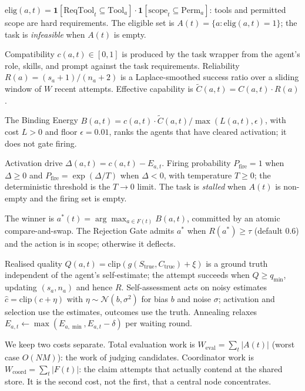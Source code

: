 \documentclass[11pt]{article}
\begin{document}
\begin{description}\itemsep2pt
\item[Eligibility (binary).] $\mathrm{elig}(a,t)=\mathbf{1}[\mathrm{ReqTool}_t\subseteq \mathrm{Tool}_a]\cdot\mathbf{1}[\mathrm{scope}_t\subseteq \mathrm{Perm}_a]$: tools and permitted scope are hard requirements. The eligible set is $A(t)=\{a: \mathrm{elig}(a,t)=1\}$; the task is \emph{infeasible} when $A(t)$ is empty.
\item[Compatibility and reliability.] Compatibility $c(a,t)\in[0,1]$ is produced by the task wrapper from the agent's role, skills, and prompt against the task requirements. Reliability $R(a)=(s_a+1)/(n_a+2)$ is a Laplace-smoothed success ratio over a sliding window of $W$ recent attempts. Effective capability is $\tilde{C}(a,t)=C(a,t)\cdot R(a)$.
\item[Selection score.] The Binding Energy $B(a,t)=c(a,t)\cdot\tilde{C}(a,t)/\max(L(a,t),\epsilon)$, with cost $L>0$ and floor $\epsilon=0.01$, ranks the agents that have cleared activation; it does not gate firing.
\item[Activation (firing).] Activation drive $\Delta(a,t)=c(a,t)-E_{a,t}$. Firing probability $P_{\mathrm{fire}}=1$ when $\Delta\geq 0$ and $P_{\mathrm{fire}}=\exp(\Delta/T)$ when $\Delta<0$, with temperature $T\geq 0$; the deterministic threshold is the $T\to 0$ limit. The task is \emph{stalled} when $A(t)$ is non-empty and the firing set is empty.
\item[Claim and trust.] The winner is $a^*(t)=\arg\max_{a\in F(t)}B(a,t)$, committed by an atomic compare-and-swap. The Rejection Gate admits $a^*$ when $R(a^*)\geq\tau$ (default $0.6$) and the action is in scope; otherwise it deflects.
\item[Outcome and feedback.] Realised quality $Q(a,t)=\mathrm{clip}(g(S_{\mathrm{true}},C_{\mathrm{true}})+\xi)$ is a ground truth independent of the agent's self-estimate; the attempt succeeds when $Q\geq q_{\min}$, updating $(s_a,n_a)$ and hence $R$. Self-assessment acts on noisy estimates $\hat{c}=\mathrm{clip}(c+\eta)$ with $\eta\sim\mathcal{N}(b,\sigma^2)$ for bias $b$ and noise $\sigma$; activation and selection use the estimates, outcomes use the truth. Annealing relaxes $E_{a,t}\leftarrow\max(E_{a,\min},E_{a,t}-\delta)$ per waiting round.
\end{description}

We keep two costs separate. Total evaluation work is $W_{\mathrm{eval}}=\sum_t|A(t)|$ (worst case $O(NM)$): the work of judging candidates. Coordinator work is $W_{\mathrm{coord}}=\sum_t|F(t)|$: the claim attempts that actually contend at the shared store. It is the second cost, not the first, that a central node concentrates.
\end{document}
